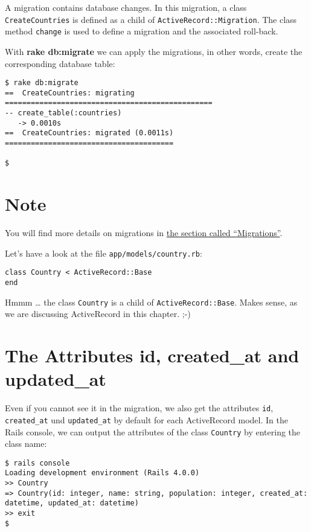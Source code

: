 \documentclass[a4paper]{book}
\newcounter{tab}[chapter]
\begin{document}
A migration contains database changes. In this migration, a class \texttt{CreateCountries} is defined as a child of \texttt{ActiveRecord::Migration}. The class method \texttt{change} is used to define a migration and the associated roll-back.

With \textbf{rake db:migrate} we can apply the migrations, in other words, create the corresponding database table:

\begin{shaded}\begin{verbatim}
$ rake db:migrate
==  CreateCountries: migrating ================================================
-- create_table(:countries)
   -> 0.0010s
==  CreateCountries: migrated (0.0011s) =======================================

$
\end{verbatim}\end{shaded}

\section{Note}\label{note-23}

You will find more details on migrations in \hyperref[activerecordux5fmigration]{the section called “Migrations”}.

Let's have a look at the file \texttt{app/models/country.rb}:

\begin{shaded}\begin{verbatim}
class Country < ActiveRecord::Base
end
\end{verbatim}\end{shaded}

Hmmm \ldots{} the class \texttt{Country} is a child of \texttt{ActiveRecord::Base}. Makes sense, as we are discussing ActiveRecord in this chapter. ;-)

\section{The Attributes id, created\_at and updated\_at}\label{the-attributes-id-createdux5fat-and-updatedux5fat}

Even if you cannot see it in the migration, we also get the attributes \texttt{id}, \texttt{created\_at} und \texttt{updated\_at} by default for each ActiveRecord model. In the Rails console, we can output the attributes of the class \texttt{Country} by entering the class name:

\begin{shaded}\begin{verbatim}
$ rails console
Loading development environment (Rails 4.0.0)
>> Country
=> Country(id: integer, name: string, population: integer, created_at: datetime, updated_at: datetime)
>> exit
$
\end{verbatim}\end{shaded}
\end{document}

